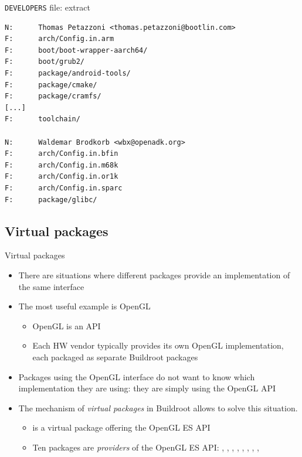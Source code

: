 \begin{frame}[fragile]{{\tt DEVELOPERS} file: extract}
\begin{block}{}
{\tiny
\begin{verbatim}
N:      Thomas Petazzoni <thomas.petazzoni@bootlin.com>
F:      arch/Config.in.arm
F:      boot/boot-wrapper-aarch64/
F:      boot/grub2/
F:      package/android-tools/
F:      package/cmake/
F:      package/cramfs/
[...]
F:      toolchain/

N:      Waldemar Brodkorb <wbx@openadk.org>
F:      arch/Config.in.bfin
F:      arch/Config.in.m68k
F:      arch/Config.in.or1k
F:      arch/Config.in.sparc
F:      package/glibc/
\end{verbatim}
}
\end{block}
\end{frame}

\subsection{Virtual packages}

\begin{frame}{Virtual packages}
  \begin{itemize}
  \item There are situations where different packages provide an
    implementation of the same interface
  \item The most useful example is OpenGL
    \begin{itemize}
    \item OpenGL is an API
    \item Each HW vendor typically provides its own OpenGL
      implementation, each packaged as separate Buildroot packages
    \end{itemize}
  \item Packages using the OpenGL interface do not want to know which
    implementation they are using: they are simply using the OpenGL
    API
  \item The mechanism of {\em virtual packages} in Buildroot allows to
    solve this situation.
    \begin{itemize}
    \item {} is a virtual package offering the OpenGL ES API
    \item Ten packages are {\em providers} of the OpenGL ES API:
      , ,
      , , ,
      , ,
      , 
    \end{itemize}
  \end{itemize}
\end{frame}

